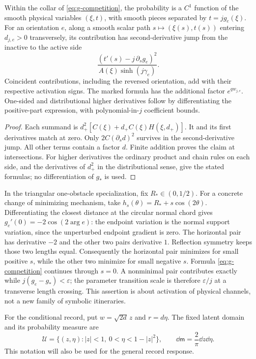 \begin{corollary}\label{cor:g-interfaces}
Within the collar of \eqref{eq:g-competition}, the probability is a
$C^1$ function of the smooth physical variables $(\xi,t)$, with smooth
pieces separated by $t=jg_e(\xi)$. For an orientation $e$, along a smooth
scalar path $s\mapsto(\xi(s),t(s))$ entering $d_{j,e}>0$ transversely,
its contribution has second-derivative jump from the inactive to the active side
\begin{equation}\label{eq:g-interface-jump}
       \frac{(t'(s)-j\,\partial_s g_e)^2}{A(\xi)\sinh(j\gamma_e)}.
\end{equation}
Coincident contributions, including the reversed orientation, add with
their respective activation signs.
The marked formula has the additional factor $e^{qw_{j,e}}$.
One-sided and distributional higher derivatives follow by differentiating
the positive-part expression, with polynomial-in-$j$ coefficient bounds.
\end{corollary}
\begin{proof}
Each summand is $d_+^2[C(\xi)+d_+C(\xi)H(\xi,d_+)]$.
It and its first derivatives match at zero. Only
$2C(\partial_s d)^2$ survives in the second-derivative jump.
All other terms contain a factor $d$. Finite addition proves the
claim at intersections. For higher derivatives the ordinary product
and chain rules on each side, and the derivatives of $d_+^2$ in the
distributional sense, give the stated formulas; no differentiation of
$g_*$ is used.
\end{proof}

In the triangular one-obstacle specialization, fix $R_*\in(0,1/2)$.
For a concrete change of minimizing mechanism, take
$h_s(\theta)=R_*+s\cos(2\theta)$. Differentiating the closest distance
at the circular normal chord gives
$g_e'(0)=-2\cos(2\arg e)$: the endpoint variation is the normal support
variation, since the unperturbed endpoint gradient is zero.
The horizontal pair has derivative $-2$ and the other two pairs derivative
$1$. Reflection symmetry keeps those two lengths equal. Consequently
the horizontal pair minimizes for small positive $s$, while the other
two minimize for small negative $s$. Formula \eqref{eq:g-competition}
continues through $s=0$. A nonminimal pair contributes exactly while
$j(g_e-g_*)<\varepsilon$; the parameter transition scale is therefore
$\varepsilon/j$ at a transverse length crossing. This assertion is about
activation of physical channels, not a new family of symbolic itineraries.


For the conditional record, put $w=\sqrt{2d}\,z$ and $r=d\eta$. The
fixed latent domain and its probability measure are
\begin{equation}\label{eq:v3-latent-domain}
 \mathcal U=\{(z,\eta):|z|<1,\ 0<\eta<1-|z|^2\},
 \qquad \dd\mathsf m=\frac2\pi\dd z\dd\eta.
\end{equation}
This notation will also be used for the general record response.
